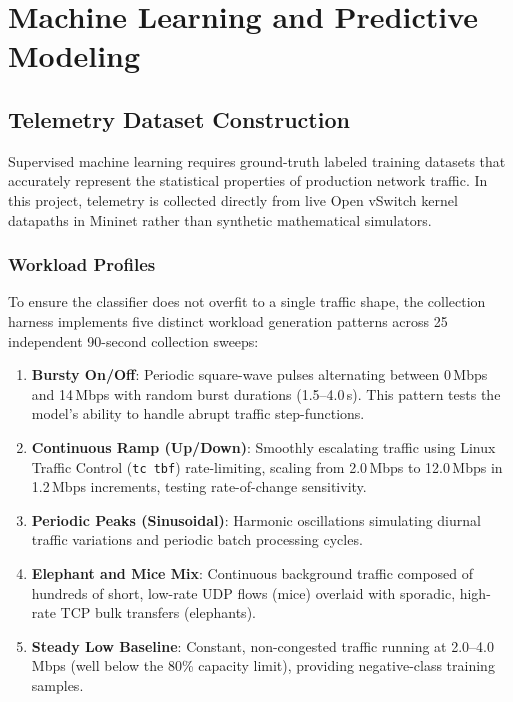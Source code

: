 \chapter{Machine Learning and Predictive Modeling}
\label{ch:machine_learning}

\section{Telemetry Dataset Construction}
Supervised machine learning requires ground-truth labeled training datasets that accurately represent the statistical properties of production network traffic. In this project, telemetry is collected directly from live Open vSwitch kernel datapaths in Mininet rather than synthetic mathematical simulators.

\subsection{Workload Profiles}
To ensure the classifier does not overfit to a single traffic shape, the collection harness implements five distinct workload generation patterns across 25 independent 90-second collection sweeps:

\begin{enumerate}
  \item \textbf{Bursty On/Off}: Periodic square-wave pulses alternating between 0\,Mbps and 14\,Mbps with random burst durations (1.5--4.0\,s). This pattern tests the model's ability to handle abrupt traffic step-functions.
  \item \textbf{Continuous Ramp (Up/Down)}: Smoothly escalating traffic using Linux Traffic Control (\texttt{tc tbf}) rate-limiting, scaling from 2.0\,Mbps to 12.0\,Mbps in 1.2\,Mbps increments, testing rate-of-change sensitivity.
  \item \textbf{Periodic Peaks (Sinusoidal)}: Harmonic oscillations simulating diurnal traffic variations and periodic batch processing cycles.
  \item \textbf{Elephant and Mice Mix}: Continuous background traffic composed of hundreds of short, low-rate UDP flows (mice) overlaid with sporadic, high-rate TCP bulk transfers (elephants).
  \item \textbf{Steady Low Baseline}: Constant, non-congested traffic running at 2.0--4.0\,Mbps (well below the 80\% capacity limit), providing negative-class training samples.
\end{enumerate}

